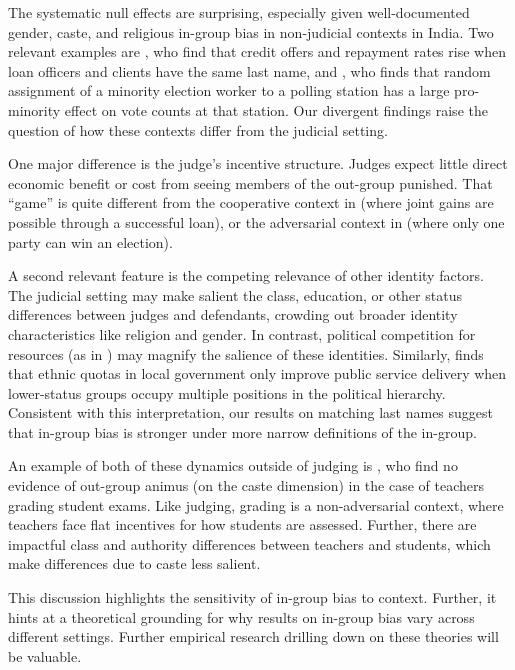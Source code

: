 \documentclass[12pt,english]{article}
\begin{document}
The systematic null effects are surprising, especially given well-documented gender, caste, and religious in-group bias in non-judicial contexts in India. Two relevant examples are \citet{fisman2017cultural}, who find that credit offers and repayment rates rise when loan officers and clients have the same last name, and \citet{neggers2018}, who finds that random assignment of a minority election worker to a polling station has a large pro-minority effect on vote counts at that station. Our divergent findings raise the question of how these contexts differ from the judicial setting.  

One major difference is the judge's incentive structure. Judges expect little direct economic benefit or cost from seeing members of the out-group punished. That ``game'' is quite different from the cooperative context in \citet{fisman2017cultural} (where joint gains are possible through a successful loan), or the adversarial context in \citet{neggers2018} (where only one party can win an election).

A second relevant feature is the competing relevance of other identity factors. The judicial setting may make salient the class, education, or other status differences between judges and defendants, crowding out broader identity characteristics like religion and gender. In contrast, political competition for resources (as in \citet{neggers2018}) may magnify the salience of these identities. Similarly, \citet{sharan2020} finds that ethnic quotas in local government only improve public service delivery when lower-status groups occupy multiple positions in the political hierarchy. Consistent with this interpretation, our results on matching last names suggest that in-group bias is stronger under more narrow definitions of the in-group.

An example of both of these dynamics outside of judging is \citet{HannaLinden2012AEJEP}, who find no evidence of out-group animus (on the caste dimension) in the case of teachers grading student exams. Like judging, grading is a non-adversarial context, where teachers face flat incentives for how students are assessed. Further, there are impactful class and authority differences between teachers and students, which make differences due to caste less salient.

This discussion highlights the sensitivity of in-group bias to context. Further, it hints at a theoretical grounding for why results on in-group bias vary across different settings. Further empirical research drilling down on these theories will be valuable.
\end{document}
